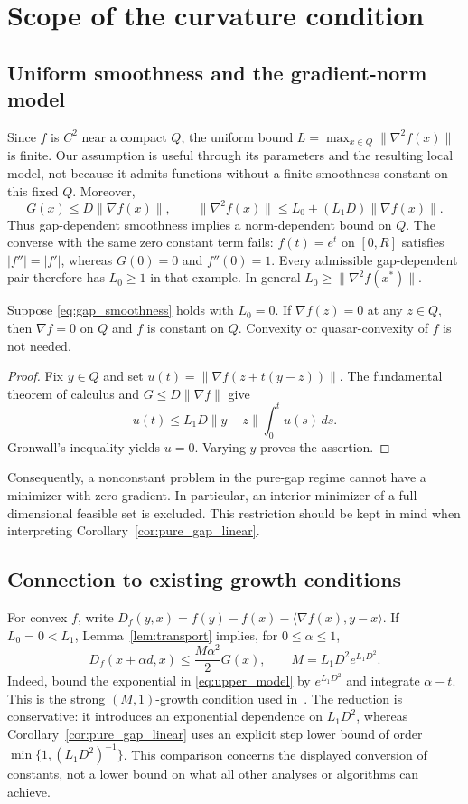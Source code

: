 \section{Scope of the curvature condition}\label{sec:structure}
\subsection{Uniform smoothness and the gradient-norm model}
Since $f$ is $C^2$ near a compact $Q$, the uniform bound
$L=\max_{x\in Q}\|\nabla^2f(x)\|$ is finite. Our assumption is useful
through its parameters and the resulting local model, not because it admits
functions without a finite smoothness constant on this fixed $Q$.
Moreover,
\[
 G(x)\le D\|\nabla f(x)\|,
 \qquad \|\nabla^2f(x)\|\le L_0+(L_1D)\|\nabla f(x)\|.
\]
Thus gap-dependent smoothness implies a norm-dependent bound on $Q$.
The converse with the same zero constant term fails: $f(t)=e^t$ on
$[0,R]$ satisfies $|f''|=|f'|$, whereas $G(0)=0$ and $f''(0)=1$.
Every admissible gap-dependent pair therefore has $L_0\ge1$ in that example.
In general $L_0\ge\|\nabla^2f(x^*)\|$.

\begin{proposition}\label{prop:rigidity}
Suppose \eqref{eq:gap_smoothness} holds with $L_0=0$.
If $\nabla f(z)=0$ at any $z\in Q$, then $\nabla f=0$ on $Q$ and
$f$ is constant on $Q$. Convexity or quasar-convexity of $f$ is not needed.
\end{proposition}
\begin{proof}
Fix $y\in Q$ and set $u(t)=\|\nabla f(z+t(y-z))\|$.
The fundamental theorem of calculus and $G\le D\|\nabla f\|$ give
\[
 u(t)\le L_1D\|y-z\|\int_0^t u(s)\,ds.
\]
Gronwall's inequality yields $u=0$. Varying $y$ proves the assertion.
\end{proof}
Consequently, a nonconstant problem in the pure-gap regime cannot have
a minimizer with zero gradient. In particular, an interior minimizer of a
full-dimensional feasible set is excluded. This restriction should be kept
in mind when interpreting Corollary~\ref{cor:pure_gap_linear}.

\subsection{Connection to existing growth conditions}
For convex $f$, write
$D_f(y,x)=f(y)-f(x)-\langle\nabla f(x),y-x\rangle$.
If $L_0=0<L_1$, Lemma~\ref{lem:transport} implies, for $0\le\alpha\le1$,
\[
 D_f(x+\alpha d,x)
 \le \frac{M\alpha^2}{2}G(x),
 \qquad M=L_1D^2e^{L_1D^2}.
\]
Indeed, bound the exponential in \eqref{eq:upper_model} by
$e^{L_1D^2}$ and integrate $\alpha-t$.
This is the strong $(M,1)$-growth condition used in~\cite{wirth}.
The reduction is conservative: it introduces an exponential dependence on
$L_1D^2$, whereas Corollary~\ref{cor:pure_gap_linear} uses an explicit
step lower bound of order $\min\{1,(L_1D^2)^{-1}\}$.
This comparison concerns the displayed conversion of constants, not a
lower bound on what all other analyses or algorithms can achieve.

